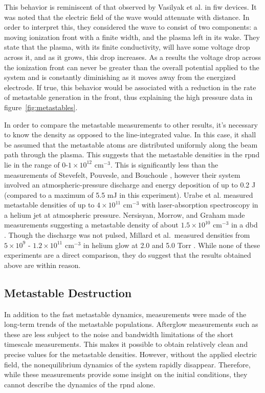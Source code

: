 This behavior is reminiscent of that observed by Vasilyak et al.
\cite{Vasilyak1994} in \acs{fiw} devices. It was noted that the electric field
of the wave would attenuate with distance. In order to interpret this, they
considered the wave to consist of two components: a moving ionization front with
a finite width, and the plasma left in its wake. They state that the plasma,
with its finite conductivity, will have some voltage drop across it, and as it
grows, this drop increases. As a results the voltage drop across the ionization
front can never be greater than the overall potential applied to the system and
is constantly diminishing as it moves away from the energized electrode. If
true, this behavior would be associated with a reduction in the rate of
metastable generation in the front, thus explaining the high pressure data in
figure~\ref{fig:metastables}.

In order to compare the metastable measurements to other results, it's necessary
to know the density as opposed to the line-integrated value. In this case, it
shall be assumed that the metastable atoms are distributed uniformly along the
beam path through the plasma. This suggests that the metastable densities in the
\acs{rpnd} lie in the range of 0-$1\times10^{12}$ cm$^{-3}$. This is
significantly less than the measurements of Stevefelt, Pouvesle, and Bouchoule
\cite{Pouvesle1988}, however their system involved an atmospheric-pressure
discharge and energy deposition of up to 0.2 J (compared to a maximum of 5.5 mJ
in this experiment). Urabe et al. \cite{Urabe2010} measured metastable densities
of up to $4\times10^{11}$ cm$^{-3}$ with laser-absorption spectroscopy in a
helium jet at atmospheric pressure. Nersisyan, Morrow, and Graham made
measurements suggesting a metastable density of about $1.5\times10^{10}$
cm$^{-3}$ in a \acs{dbd} \cite{Nersisyan2004}. Though the discharge was not
pulsed, Millard et al.\ measured densities from $5\times10^9$ -
$1.2\times10^{11}$ cm$^{-3}$ in helium glow at 2.0 and 5.0 Torr
\cite{Millard1998}. While none of these experiments are a direct comparison,
they do suggest that the results obtained above are within reason.

\subsection{Metastable Destruction}

In addition to the fast metastable dynamics, measurements were made of the
long-term trends of the metastable populations. Afterglow measurements such as
these are less subject to the noise and bandwidth limitations of the short
timescale measurements. This makes it possible to obtain relatively clean and
precise values for the metastable densities. However, without the applied
electric field, the nonequilibrium dynamics of the system rapidly disappear.
Therefore, while these measurements provide some insight on the initial
conditions, they cannot describe the dynamics of the \acs{rpnd} alone.

